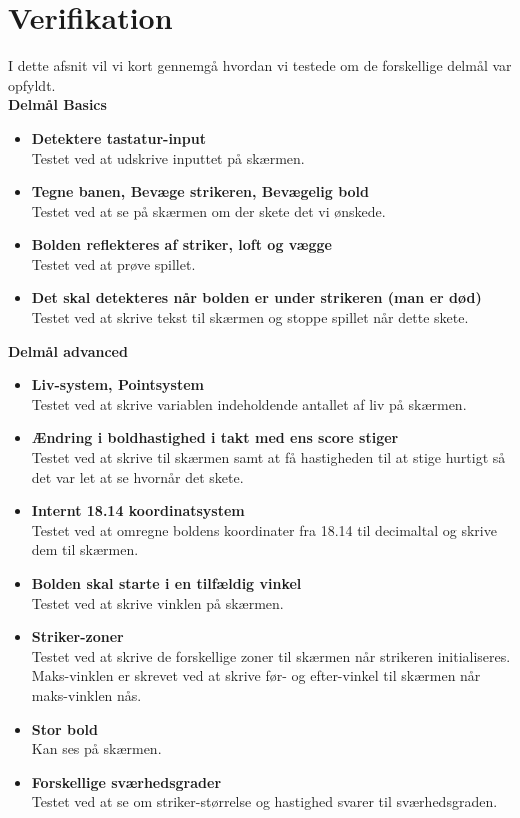 \newpage
\chapter{Verifikation}

I dette afsnit vil vi kort gennemgå hvordan vi testede om de forskellige delmål var opfyldt. \\


\textbf{Delmål Basics}
\begin{itemize}
\item \textbf{Detektere tastatur-input }
\\ Testet ved at udskrive inputtet på skærmen.
\item \textbf{Tegne banen, Bevæge strikeren, Bevægelig bold}
\\ Testet ved at se på skærmen om der skete det vi ønskede.

\item \textbf{Bolden reflekteres af striker, loft og vægge}
\\ Testet ved at prøve spillet.
\item \textbf{Det skal detekteres når bolden er under strikeren (man er død)}
\\ Testet ved at skrive tekst til skærmen og stoppe spillet når dette skete.
\end{itemize}

\textbf{Delmål advanced}
\begin{itemize}
\item \textbf{Liv-system, Pointsystem}
\\ Testet ved at skrive variablen indeholdende antallet af liv på skærmen.

\item \textbf{Ændring i boldhastighed i takt med ens score stiger}
\\ Testet ved at skrive til skærmen samt at få hastigheden til at stige hurtigt så det var let at se hvornår det skete.

\item \textbf{Internt 18.14 koordinatsystem}
\\ Testet ved at omregne boldens koordinater fra 18.14 til decimaltal og skrive dem til skærmen.
\item \textbf{Bolden skal starte i en tilfældig vinkel}
\\ Testet ved at skrive vinklen på skærmen.
\item \textbf{Striker-zoner}
\\ Testet ved at skrive de forskellige zoner til skærmen når strikeren initialiseres. Maks-vinklen er skrevet ved at skrive før- og efter-vinkel til skærmen når maks-vinklen nås. 
\item \textbf{Stor bold}
\\ Kan ses på skærmen.
\item \textbf{Forskellige sværhedsgrader}
\\ Testet ved at se om striker-størrelse og hastighed svarer til sværhedsgraden.

\end{itemize}	

